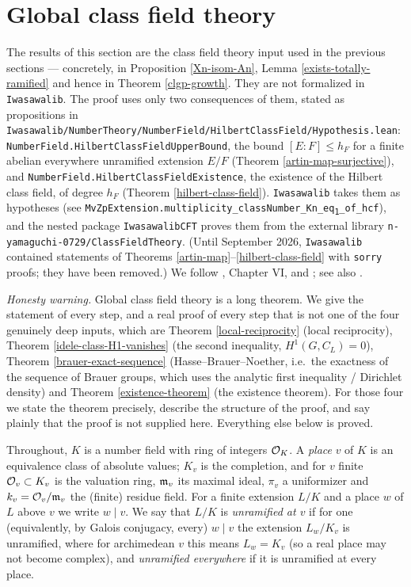 \section{Global class field theory}

The results of this section are the class field theory input used in the
previous sections --- concretely, in Proposition \ref{Xn-isom-An}, Lemma
\ref{exists-totally-ramified} and hence in Theorem \ref{clgp-growth}.
They are not formalized in \texttt{Iwasawalib}.
The {\Lean} proof uses only two consequences of them, stated as propositions in
\texttt{Iwasawalib/NumberTheory/NumberField/HilbertClassField/Hypothesis.lean}:
\texttt{NumberField.HilbertClassFieldUpperBound}, the bound $[E:F]\leq h_F$ for a
finite abelian everywhere unramified extension $E/F$ (Theorem
\ref{artin-map-surjective}), and \texttt{NumberField.HilbertClassFieldExistence},
the existence of the Hilbert class field, of degree $h_F$ (Theorem
\ref{hilbert-class-field}).
\texttt{Iwasawalib} takes them as hypotheses (see
\texttt{MvZpExtension.multiplicity\_classNumber\_Kn\_eq\textsubscript{1}\_of\_hcf}),
and the nested package \texttt{IwasawalibCFT} proves them from the external
library \texttt{n-yamaguchi-0729/ClassFieldTheory}.
(Until September 2026, \texttt{Iwasawalib} contained statements of Theorems
\ref{artin-map}--\ref{hilbert-class-field} with \texttt{sorry} proofs; they
have been removed.)
We follow \cite{Neu99}, Chapter VI, and \cite{Mil20}; see also \cite{CF67}.

\emph{Honesty warning.}
Global class field theory is a long theorem.
We give the statement of every step, and a real proof of every step that is not
one of the four genuinely deep inputs, which are
Theorem \ref{local-reciprocity} (local reciprocity),
Theorem \ref{idele-class-H1-vanishes} (the second inequality,
$H^1(G,C_L)=0$),
Theorem \ref{brauer-exact-sequence} (Hasse--Brauer--Noether, i.e.~the exactness
of the sequence of Brauer groups, which uses the analytic first inequality /
Dirichlet density) and
Theorem \ref{existence-theorem} (the existence theorem).
For those four we state the theorem precisely, describe the structure of the
proof, and say plainly that the proof is not supplied here.
Everything else below is proved.

Throughout, $K$ is a number field with ring of integers ${\mathcal {O}}_K$.
A \emph{place} $v$ of $K$ is an equivalence class of absolute values; $K_v$ is
the completion, and for $v$ finite ${\mathcal {O}}_v\subset K_v$ is the valuation ring,
${\mathfrak{m}}_v$ its maximal ideal, $\pi_v$ a uniformizer and $k_v={\mathcal {O}}_v/{\mathfrak{m}}_v$ the
(finite) residue field.
For a finite extension $L/K$ and a place $w$ of $L$ above $v$ we write $w\mid v$.
We say that $L/K$ is \emph{unramified at $v$} if for one (equivalently, by
Galois conjugacy, every) $w\mid v$ the extension $L_w/K_v$ is unramified, where
for archimedean $v$ this means $L_w=K_v$ (so a real place may not become complex),
and \emph{unramified everywhere} if it is unramified at every place.

